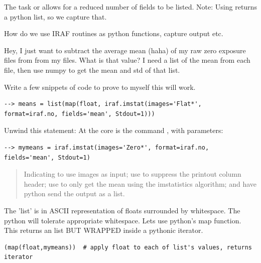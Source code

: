 The task  or  allows for a
reduced number of fields to be listed.
Note: Using  returns a python list, so we capture that.


\example How do we use IRAF routines as python functions, capture output etc.

\prose Hey, I just want to subtract the average mean (haha) of my raw zero exposure files from
from my files. What is that value? I need a list of the mean from each file, then use 
numpy to get the mean and std of that list.

\exercise Write a few snippets of code to prove to myself this will work.

\begingroup \fontsize{10pt}{10pt}
\selectfont
\begin{verbatim} 
--> means = list(map(float, iraf.imstat(images='Flat*', format=iraf.no, fields='mean', Stdout=1)))
\end{verbatim}
\endgroup

Unwind this statement: At the core is the command , with parameters:

\begingroup \fontsize{10pt}{10pt}
\selectfont
\begin{verbatim} 
--> mymeans = iraf.imstat(images='Zero*', format=iraf.no, fields='mean', Stdout=1)
\end{verbatim}
\endgroup

\begin{quote}
Indicating to use images  as input; use
 to suppress the printout column header; use
 to only get the mean using the imstatistics
algorithm; and have python send the output as a list.
\end{quote}


The  'list' is in ASCII representation of floats
surrounded by whitespace. The python  will tolerate appropriate
whitespace. Lets use python's map function. This returns an list BUT WRAPPED
inside a pythonic iterator.

\begingroup \fontsize{10pt}{10pt}
\selectfont
\begin{verbatim} 
(map(float,mymeans))  # apply float to each of list's values, returns iterator
\end{verbatim}
\endgroup

